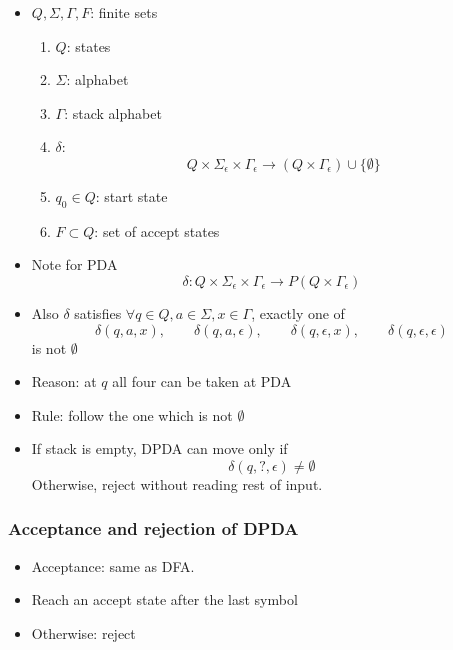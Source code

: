 \begin{frame}[allowframebreaks]
\begin{itemize}
\item [] $Q, \Sigma, \Gamma, F$: finite sets
\begin{enumerate}
\item $Q$: states
\item $\Sigma$: alphabet
\item $\Gamma$: stack alphabet
\item $\delta$: 
  \begin{equation*}
Q \times 
\Sigma_{\epsilon} \times \Gamma_{\epsilon}
\rightarrow (Q\times \Gamma_\epsilon)\cup \{\emptyset\} 
\end{equation*}
\item $q_0 \in Q$: start state
\item $F \subset Q$: set of accept states
\end{enumerate}
\item Note for PDA
  \begin{equation*}
\delta: Q \times 
\Sigma_{\epsilon} \times \Gamma_{\epsilon}
\rightarrow P(Q\times \Gamma_\epsilon)
\end{equation*}
\item Also $\delta$ satisfies $\forall q \in Q, a \in \Sigma, x \in
\Gamma$, exactly one of
\begin{equation*}
  \delta(q,a,x), \qquad \delta(q,a,\epsilon), \qquad
\delta(q, \epsilon, x), \qquad \delta(q, \epsilon, \epsilon)
\end{equation*}
is not $\emptyset$

\item Reason: at $q$ all four can be taken at PDA
\item Rule: follow the one which is not $\emptyset$
\item If stack is empty, DPDA can move only if
  \begin{equation}
    \label{eq:cannotmove}
    \delta(q, ?, \epsilon) \neq \emptyset
  \end{equation}
Otherwise, reject without reading rest of input. 

\end{itemize}\end{frame} \begin{frame}[allowframebreaks] \frametitle{Acceptance and rejection of DPDA}
  \begin{itemize}
\item Acceptance: same as DFA. 
\item [] Reach an accept state after the last symbol
\item [] Otherwise: reject


\end{itemize}
\end{frame}
